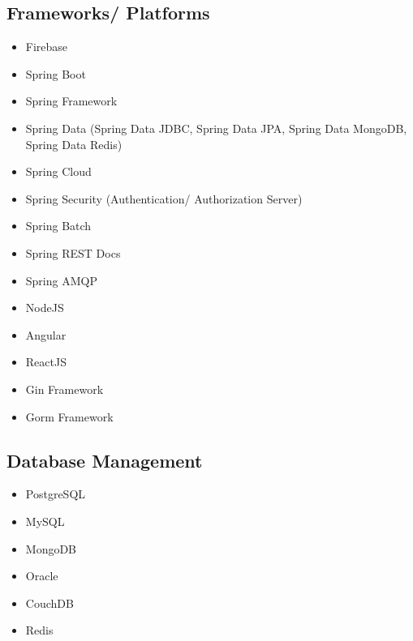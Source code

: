 \begin{cventries}
\begin{row}[cellsep=0.75cm]{3}{3}
    \begin{cell}{1}
	\section*{Frameworks/ Platforms}
	\vspace{-1.5ex}
    \begin{itemize}
        \item {Firebase}
        \item {Spring Boot}
        \item {Spring Framework}
        \item {Spring Data (Spring Data JDBC, Spring Data JPA, Spring Data MongoDB, Spring Data Redis)}
        \item {Spring Cloud}
        \item {Spring Security (Authentication/ Authorization Server)}
        \item {Spring Batch}
        \item {Spring REST Docs}
        \item {Spring AMQP}
        \item {NodeJS}
        \item {Angular}
        \item {ReactJS}
        \item {Gin Framework}
        \item {Gorm Framework}
    \end{itemize}
	\end{cell}
    \begin{cell}{1}
	\section*{Database Management}
	\vspace{-1.5ex}
    \begin{itemize}
        \item {PostgreSQL}
        \item {MySQL}
        \item {MongoDB}
        \item {Oracle}
        \item {CouchDB}
        \item {Redis}
    \end{itemize}
	\end{cell}
	\begin{cell}{1}

\end{cell}
\end{row}
\end{cventries}
